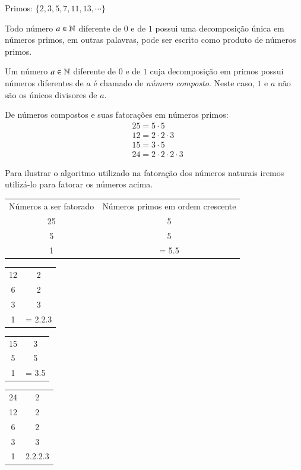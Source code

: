  
 \begin{exem}
 Primos: $\{2, 3, 5, 7, 11, 13, \cdots\}$
 \end{exem}
 
 \begin{teo}
 Todo número $a \in \mathbb{N}$ diferente de $0$ e de $1$ possui uma decomposição única em números primos, em outras palavras, pode ser escrito como produto de números primos.
 \end{teo}
 
 \begin{defi}
 Um número $a \in \mathbb{N}$ diferente de $0$ e de $1$ cuja decomposição em primos possui números diferentes de $a$ é chamado de \emph{número composto}. Neste caso, $1$ e $a$ não são os únicos divisores de $a$.
 \end{defi}
 
 \begin{exem} De números compostos e suas fatorações em números primos:
 \begin{align*} 
 &25= 5 \cdot 5 \\
 &12= 2 \cdot 2 \cdot 3 \\
 &15= 3 \cdot 5 \\
 &24= 2 \cdot 2 \cdot 2 \cdot 3
 \end{align*}
 \end{exem}
 
 Para ilustrar o algoritmo utilizado na fatoração dos números naturais iremos utilizá-lo para fatorar os números acima.
 
 \begin{tabular}{c|c}
  Números a ser fatorado & Números primos em ordem crescente \\
  25 & 5 \\
  5  & 5 \\
  1  & = 5.5  \\
 \end{tabular}
 
 \begin{multicols}{3}
   \begin{tabular}{c|c}
  12 & 2 \\
   6 & 2 \\
   3 & 3 \\
   1 & = 2.2.3 \\
 \end{tabular}
 
 \begin{tabular}{c|c}
  15 & 3 \\
   5 & 5 \\
   1 & = 3.5 \\
 \end{tabular}
 
 \begin{tabular}{c|c}
  24 & 2 \\
  12 & 2 \\
   6 & 2 \\
   3 & 3 \\
   1 & 2.2.2.3 \\
 \end{tabular}
 \end{multicols}

